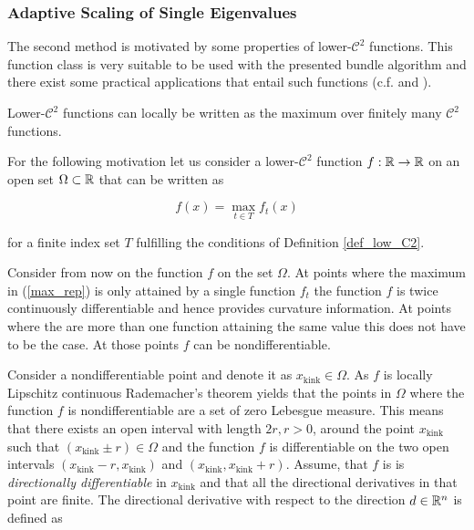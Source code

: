 \subsubsection{Adaptive Scaling of Single Eigenvalues}

The second method is motivated by some properties of lower-\(\mathcal{C}^2\) functions. This function class is very suitable to be used with the presented bundle algorithm and there exist some practical applications that entail such functions (c.f. \cite{Hare2010} and \cite{Hare2016}).

Lower-\(\mathcal{C}^2\) functions can locally be written as the maximum over finitely many \(\mathcal{C}^2\) functions.

For the following motivation let us consider a lower-\(\mathcal{C}^2\) function \(f:\mathbb{R} \to \mathbb{R}\) on an open set \(\Omega \subset \mathbb{R}\) that can be written as

\begin{equation}
	f(x) = \max_{t \in T} f_t(x)
\label{max_rep}
\end{equation}

for a finite index set \(T\) fulfilling the conditions of Definition \ref{def_low_C2}.

Consider from now on the function \(f\) on the set \(\Omega\).
At points where the maximum in (\ref{max_rep}) is only attained by a single function \(f_t\) the function \(f\) is twice continuously differentiable and hence provides curvature information. At points where the are more than one function attaining the same value this does not have to be the case. At those points \(f\) can be nondifferentiable.

Consider a nondifferentiable point and denote it as \(x_{\text{kink}} \in \Omega\).
As \(f\) is locally Lipschitz continuous Rademacher's theorem yields that the points in \(\Omega\) where the function \(f\) is nondifferentiable are a set of zero Lebesgue measure. This means that there exists an open interval with length \(2r, r >0 \), around  the point \(x_{\text{kink}}\) such that \((x_{\text{kink}} \pm r) \in \Omega\) and the function \(f\) is differentiable on the two open intervals \((x_{\text{kink}}-r,x_{\text{kink}})\)  and \((x_{\text{kink}},x_{\text{kink}}+r)\). Assume, that \(f\) is is \emph{directionally differentiable} in \(x_{\text{kink}}\) and that all the directional derivatives in that point are finite.
The directional derivative with respect to the direction \(d \in \mathbb{R}^n\) is defined as \cite[p. 213]{Rockafellar1970}

